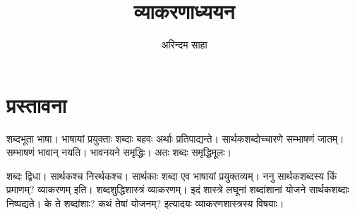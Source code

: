 \documentclass[12pt,a4paper]{report}
\author{अरिन्दम साहा}
\title{व्याकरणाध्ययन}
\begin{document}
\maketitle

\chapter{प्रस्तावना}

शब्दभूता भाषा। भाषायां प्रयुक्ताः शब्दाः बहवः अर्थाः प्रतिपाद्यन्ते। सार्थकशब्दोच्चारणे सम्भाषणं जातम्। सम्भाषणं भावान् नयति। भावनयने समृद्धिः।
अतः शब्दः समृद्धिमूलः।

शब्दः द्विधा। सार्थकश्च निरर्थकश्च। सार्थकाः शब्दा एव भाषायां प्रयुक्तव्यम्। ननु सार्थकशब्दस्य किं प्रमाणम्? व्याकरणम् इति। शब्दशुद्धिशास्त्रं व्याकरणम्। इदं शास्त्रे लघूनां शब्दांशानां योजने सार्थकशब्दाः निष्पद्यते। के ते शब्दांशाः? कथं तेषां योजनम्? इत्यादयः व्याकरणशास्त्रस्य विषयाः।
\end{document}
